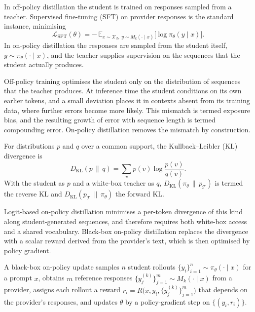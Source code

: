 \begin{Definitions}
In off-policy distillation the student is trained on responses sampled from a
teacher. Supervised fine-tuning (SFT) on provider responses is the standard instance,
minimising
\[
  \mathcal{L}_{\mathrm{SFT}}(\theta) =
  -\,\mathbb{E}_{x \sim \mathcal{X}_d,\; y \sim M_k(\cdot \mid x)}
  \big[ \log \pi_\theta(y \mid x) \big].
\]
In on-policy distillation the responses are sampled from the student itself,
$y \sim \pi_\theta(\cdot \mid x)$, and the teacher supplies supervision on the
sequences that the student actually produces.
\end{Definitions}

Off-policy training optimises the student only on the distribution of sequences that
the teacher produces. At inference time the student conditions on its own earlier
tokens, and a small deviation places it in contexts absent from its training data,
where further errors become more likely. This mismatch is termed exposure bias,
and the resulting growth of error with sequence length is termed compounding
error. On-policy distillation removes the mismatch by construction.

\begin{Definitions}[Divergences]
For distributions $p$ and $q$ over a common support, the Kullback--Leibler (KL)
divergence is
\[
  D_{\mathrm{KL}}(p \,\|\, q) = \sum_{v} p(v) \log \frac{p(v)}{q(v)}.
\]
With the student as $p$ and a white-box teacher as $q$,
$D_{\mathrm{KL}}(\pi_\theta \,\|\, p_{\mathcal{T}})$ is termed the reverse KL
and $D_{\mathrm{KL}}(p_{\mathcal{T}} \,\|\, \pi_\theta)$ the forward KL.
\end{Definitions}

Logit-based on-policy distillation minimises a per-token divergence of this kind along
student-generated sequences, and therefore requires both white-box access and a
shared vocabulary. Black-box on-policy distillation replaces the divergence with a
scalar reward derived from the provider's text, which is then optimised by policy
gradient.

\begin{Definitions}
A black-box on-policy update samples $n$ student rollouts
$\{y_i\}_{i=1}^{n} \sim \pi_\theta(\cdot \mid x)$ for a prompt $x$, obtains $m$
reference responses $\{y^{(k)}_j\}_{j=1}^{m} \sim M_k(\cdot \mid x)$ from a provider,
assigns each rollout a reward
$r_i = R\big(x, y_i, \{y^{(k)}_j\}_{j=1}^{m}\big)$ that depends on the provider's
responses, and updates $\theta$ by a policy-gradient step on $\{(y_i, r_i)\}$.
\end{Definitions}

